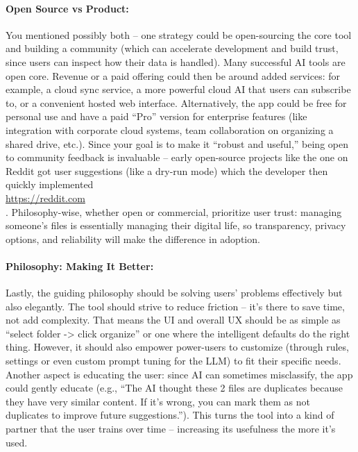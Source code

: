 \documentclass[11pt]{article}
\begin{document}
\paragraph{Open Source vs Product:} You mentioned possibly both -- one strategy could be open-sourcing the core tool and building a community (which can accelerate development and build trust, since users can inspect how their data is handled). Many successful AI tools are open core. Revenue or a paid offering could then be around added services: for example, a cloud sync service, a more powerful cloud AI that users can subscribe to, or a convenient hosted web interface. Alternatively, the app could be free for personal use and have a paid “Pro” version for enterprise features (like integration with corporate cloud systems, team collaboration on organizing a shared drive, etc.). Since your goal is to make it “robust and useful,” being open to community feedback is invaluable -- early open-source projects like the one on Reddit got user suggestions (like a dry-run mode) which the developer then quickly implemented \\ \url{https://reddit.com} \\ . Philosophy-wise, whether open or commercial, prioritize user trust: managing someone’s files is essentially managing their digital life, so transparency, privacy options, and reliability will make the difference in adoption.

\paragraph{Philosophy: Making It Better:} Lastly, the guiding philosophy should be solving users’ problems effectively but also elegantly. The tool should strive to reduce friction -- it’s there to save time, not add complexity. That means the UI and overall UX should be as simple as “select folder -> click organize” or one where the intelligent defaults do the right thing. However, it should also empower power-users to customize (through rules, settings or even custom prompt tuning for the LLM) to fit their specific needs. Another aspect is educating the user: since AI can sometimes misclassify, the app could gently educate (e.g., “The AI thought these 2 files are duplicates because they have very similar content. If it’s wrong, you can mark them as not duplicates to improve future suggestions.”). This turns the tool into a kind of partner that the user trains over time -- increasing its usefulness the more it’s used.
\end{document}
